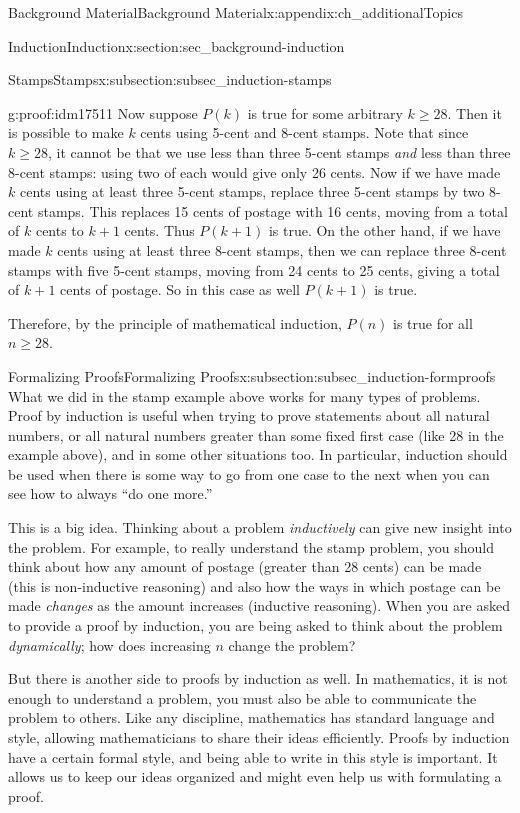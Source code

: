 \documentclass[oneside,10pt,]{book}
\numberwithin{equation}{chapter}
\begin{document}
\begin{appendixptx}{Background Material}{}{Background Material}{}{}{x:appendix:ch_additionalTopics}
\begin{sectionptx}{Induction}{}{Induction}{}{}{x:section:sec_background-induction}
\begin{subsectionptx}{Stamps}{}{Stamps}{}{}{x:subsection:subsec_induction-stamps}
\begin{proofptx}{}{g:proof:idm17511}
Now suppose \(P(k)\) is true for some arbitrary \(k \ge 28\). Then it is possible to make \(k\) cents using 5-cent and 8-cent stamps. Note that since \(k \ge 28\), it cannot be that we use less than three 5-cent stamps \emph{and} less than three 8-cent stamps: using two of each would give only 26 cents. Now if we have made \(k\) cents using at least three 5-cent stamps, replace three 5-cent stamps by two 8-cent stamps. This replaces 15 cents of postage with 16 cents, moving from a total of \(k\) cents to \(k+1\) cents. Thus \(P(k+1)\) is true. On the other hand, if we have made \(k\) cents using at least three 8-cent stamps, then we can replace three 8-cent stamps with five 5-cent stamps, moving from 24 cents to 25 cents, giving a total of \(k+1\) cents of postage. So in this case as well \(P(k+1)\) is true.%
\par
Therefore, by the principle of mathematical induction, \(P(n)\) is true for all \(n \ge 28\).%
\end{proofptx}
\end{subsectionptx}
%
%
\typeout{************************************************}
\typeout{************************************************}
%
\begin{subsectionptx}{Formalizing Proofs}{}{Formalizing Proofs}{}{}{x:subsection:subsec_induction-formproofs}
What we did in the stamp example above works for many types of problems. Proof by induction is useful when trying to prove statements about all natural numbers, or all natural numbers greater than some fixed first case (like 28 in the example above), and in some other situations too. In particular, induction should be used when there is some way to go from one case to the next \textendash{} when you can see how to always ``do one more.''%
\par
This is a big idea. Thinking about a problem \emph{inductively} can give new insight into the problem. For example, to really understand the stamp problem, you should think about how any amount of postage (greater than 28 cents) can be made (this is non-inductive reasoning) and also how the ways in which postage can be made \emph{changes} as the amount increases (inductive reasoning). When you are asked to provide a proof by induction, you are being asked to think about the problem \emph{dynamically}; how does increasing \(n\) change the problem?%
\par
But there is another side to proofs by induction as well. In mathematics, it is not enough to understand a problem, you must also be able to communicate the problem to others. Like any discipline, mathematics has standard language and style, allowing mathematicians to share their ideas efficiently. Proofs by induction have a certain formal style, and being able to write in this style is important. It allows us to keep our ideas organized and might even help us with formulating a proof.%

\end{subsectionptx}
\end{sectionptx}
\end{appendixptx}
\end{document}
